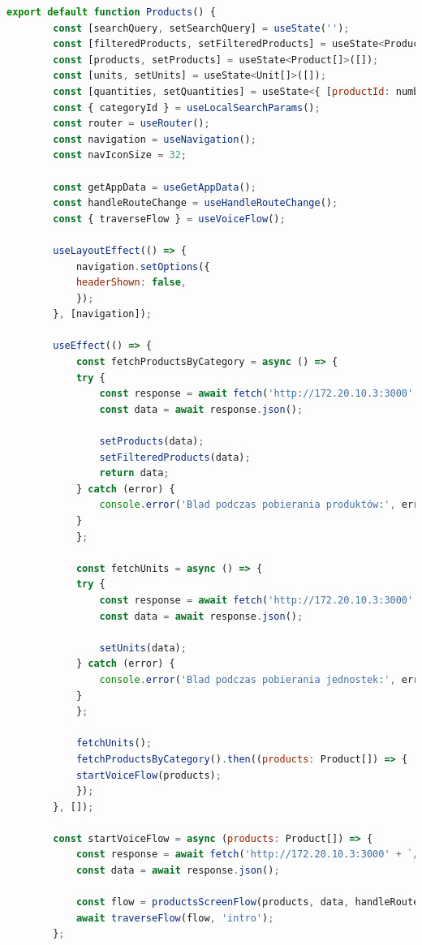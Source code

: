\begin{lstlisting}[language=JavaScript, caption=Ekran produktów implementacja, label=lst:products_view]
    export default function Products() {
        const [searchQuery, setSearchQuery] = useState('');
        const [filteredProducts, setFilteredProducts] = useState<Product[]>([]);
        const [products, setProducts] = useState<Product[]>([]);
        const [units, setUnits] = useState<Unit[]>([]);
        const [quantities, setQuantities] = useState<{ [productId: number]: number }>({});
        const { categoryId } = useLocalSearchParams();
        const router = useRouter();
        const navigation = useNavigation();
        const navIconSize = 32;

        const getAppData = useGetAppData();
        const handleRouteChange = useHandleRouteChange();
        const { traverseFlow } = useVoiceFlow();

        useLayoutEffect(() => {
            navigation.setOptions({
            headerShown: false,
            });
        }, [navigation]);

        useEffect(() => {
            const fetchProductsByCategory = async () => {
            try {
                const response = await fetch('http://172.20.10.3:3000' + `/products/category/${categoryId}`);
                const data = await response.json();

                setProducts(data);
                setFilteredProducts(data);
                return data;
            } catch (error) {
                console.error('Blad podczas pobierania produktów:', error);
            }
            };

            const fetchUnits = async () => {
            try {
                const response = await fetch('http://172.20.10.3:3000' + `/units`);
                const data = await response.json();

                setUnits(data);
            } catch (error) {
                console.error('Blad podczas pobierania jednostek:', error);
            }
            };

            fetchUnits();
            fetchProductsByCategory().then((products: Product[]) => {
            startVoiceFlow(products);
            });
        }, []);

        const startVoiceFlow = async (products: Product[]) => {
            const response = await fetch('http://172.20.10.3:3000' + `/units`);
            const data = await response.json();

            const flow = productsScreenFlow(products, data, handleRouteChange, addToCartCommand);
            await traverseFlow(flow, 'intro');
        };


\end{lstlisting}
